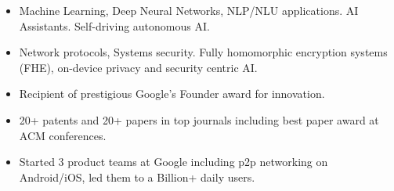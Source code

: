 

\begin{resume}
 
\begin{itemize}
\item [] Machine Learning, Deep Neural Networks, NLP/NLU applications. AI Assistants. Self-driving autonomous AI. 
\item [] Network protocols, Systems security. Fully homomorphic encryption systems (FHE), on-device privacy and security centric AI.
\item [] Recipient of prestigious Google's Founder award for innovation.
\item [] 20+ patents and 20+ papers in top journals including best paper award at ACM conferences.
\item [] Started 3 product teams at Google including p2p networking on Android/iOS, led them to a Billion+ daily users.
\end{itemize}


\end{resume}

